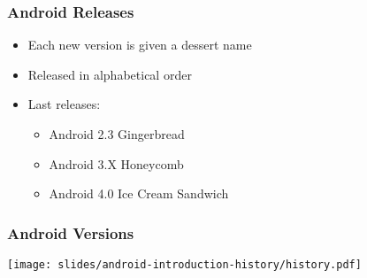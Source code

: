 \begin{frame}
  \frametitle{Android Releases}
  \begin{itemize}
  \item Each new version is given a dessert name
  \item Released in alphabetical order
  \item Last releases:
    \begin{itemize}
    \item Android 2.3 Gingerbread
    \item Android 3.X Honeycomb
    \item Android 4.0 Ice Cream Sandwich
    \end{itemize}
  \end{itemize}
\end{frame}

\begin{frame}
  \frametitle{Android Versions}
  \begin{center}
    \texttt{[image: slides/android-introduction-history/history.pdf]}
  \end{center}
\end{frame}

